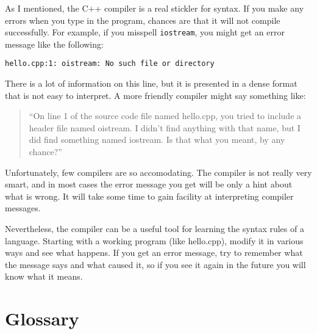As I mentioned, the C++ compiler is a real stickler for syntax.
If you make any errors when you type in the program, chances
are that it will not compile successfully.  For example, if
you misspell {\tt iostream}, you might get an error message like
the following:

\begin{verbatim}
hello.cpp:1: oistream: No such file or directory
\end{verbatim}
%
There is a lot of information on this line, but it is presented
in a dense format that is not easy to interpret.  A more friendly
compiler might say something like:

\begin{quote}
``On line 1 of the source code file named hello.cpp, you tried to
include a header file named oistream.  I didn't find anything
with that name, but I did find something named iostream.  Is
that what you meant, by any chance?''
\end{quote}

Unfortunately, few compilers are so accomodating.  The compiler
is not really very smart, and in most cases the error message
you get will be only a hint about what is wrong.  It will take
some time to gain facility at interpreting compiler messages.

Nevertheless, the compiler can be a useful tool for learning the
syntax rules of a language.  Starting with a working program
(like hello.cpp), modify it in various ways and see what happens.
If you get an error message, try to remember what the message says
and what caused it, so if you see it again in the future you
will know what it means.

\section{Glossary}

